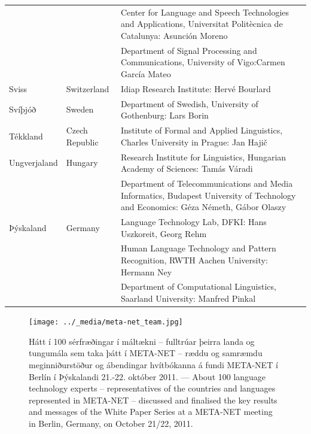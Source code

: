 \documentclass{../../metanetpaper}
\begin{document}
\begin{longtable}{llp{105mm}}
  & & Center for Language and Speech Technologies and Applications, Universitat Politècnica de Catalunya:  Asunción Moreno \\ \addlinespace 
  & & Department of Signal Processing and Communications, University of Vigo:\newline Carmen García Mateo \\ \addlinespace 
  Sviss & \textcolor{grey1}{Switzerland} & Idiap Research Institute: Hervé Bourlard \\ \addlinespace 
  Svíþjóð & \textcolor{grey1}{Sweden} & Department of Swedish, University of Gothenburg: Lars Borin \\ \addlinespace 
  Tékkland & \textcolor{grey1}{Czech Republic} & Institute of Formal and Applied Linguistics, Charles University in Prague: Jan Hajič \\ \addlinespace
  Ungverjaland & \textcolor{grey1}{Hungary} & Research Institute for Linguistics, Hungarian Academy of Sciences: Tamás Váradi\\  \addlinespace
  & & Department of Telecommunications and Media Informatics, Budapest University of Technology and Economics: Géza Németh, Gábor Olaszy\\ \addlinespace
  Þýskaland & \textcolor{grey1}{Germany} & Language Technology Lab, DFKI: Hans Uszkoreit, Georg Rehm\\ \addlinespace
  & & Human Language Technology and Pattern Recognition, RWTH Aachen University: Hermann Ney \\ \addlinespace
  & & Department of Computational Linguistics, Saarland University: Manfred Pinkal
\end{longtable}
\normalsize

\renewcommand*{\figureformat}{}
\renewcommand*{\captionformat}{}

\begin{figure}[htbp]
  \center
  \texttt{[image: ../\_media/meta-net\_team.jpg]}
  \caption{Hátt í 100 sérfræðingar í máltækni -- fulltrúar þeirra landa og tungumála sem taka þátt í META-NET -- ræddu og samræmdu meginniðurstöður og ábendingar hvítbókanna á fundi META-NET í Berlín í Þýskalandi 21.-22. október 2011. --- \textcolor{grey1}{About 100 language technology experts -- representatives of the countries and languages represented in META-NET -- discussed and finalised the key results and messages of the White Paper Series at a META-NET meeting in Berlin, Germany, on October 21/22, 2011.}}
  \medskip
\end{figure}
\end{document}
